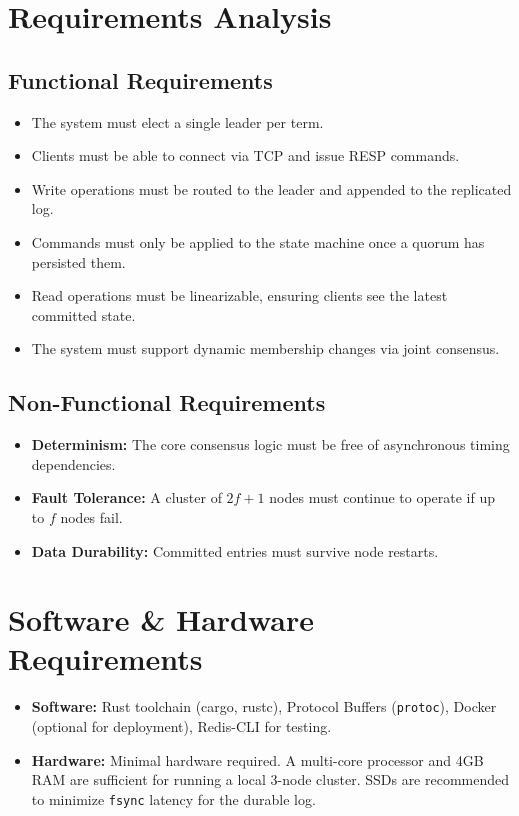 \documentclass[12pt,a4paper]{report}
\begin{document}
\section{Requirements Analysis}
\subsection{Functional Requirements}
\begin{itemize}
    \item The system must elect a single leader per term.
    \item Clients must be able to connect via TCP and issue RESP commands.
    \item Write operations must be routed to the leader and appended to the replicated log.
    \item Commands must only be applied to the state machine once a quorum has persisted them.
    \item Read operations must be linearizable, ensuring clients see the latest committed state.
    \item The system must support dynamic membership changes via joint consensus.
\end{itemize}

\subsection{Non-Functional Requirements}
\begin{itemize}
    \item \textbf{Determinism:} The core consensus logic must be free of asynchronous timing dependencies.
    \item \textbf{Fault Tolerance:} A cluster of $2f+1$ nodes must continue to operate if up to $f$ nodes fail.
    \item \textbf{Data Durability:} Committed entries must survive node restarts.
\end{itemize}

\section{Software \& Hardware Requirements}
\begin{itemize}
    \item \textbf{Software:} Rust toolchain (cargo, rustc), Protocol Buffers (\texttt{protoc}), Docker (optional for deployment), Redis-CLI for testing.
    \item \textbf{Hardware:} Minimal hardware required. A multi-core processor and 4GB RAM are sufficient for running a local 3-node cluster. SSDs are recommended to minimize \texttt{fsync} latency for the durable log.
\end{itemize}
\end{document}
